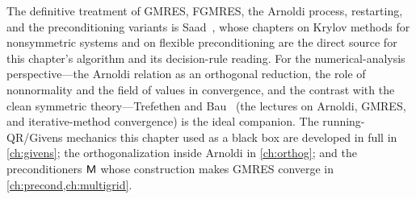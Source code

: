 \furtherreading
The definitive treatment of GMRES, FGMRES, the Arnoldi process, restarting, and the
preconditioning variants is Saad~\citep{saad2003}, whose chapters on Krylov methods for
nonsymmetric systems and on flexible preconditioning are the direct source for this
chapter's algorithm and its decision-rule reading. For the numerical-analysis
perspective---the Arnoldi relation as an orthogonal reduction, the role of
nonnormality and the field of values in convergence, and the contrast with the clean
symmetric theory---Trefethen and Bau~\citep{trefethenbau1997} (the lectures on
Arnoldi, GMRES, and iterative-method convergence) is the ideal companion. The
running-QR/Givens mechanics this chapter used as a black box are developed in full in
\cref{ch:givens}; the orthogonalization inside Arnoldi in \cref{ch:orthog}; and the
preconditioners $\mathsf{M}$ whose construction makes GMRES converge in
\cref{ch:precond,ch:multigrid}.

